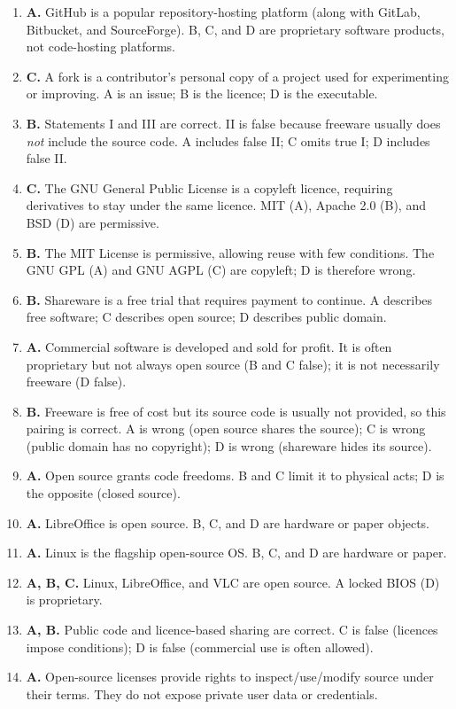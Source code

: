 \begin{enumerate}[label=\textbf{Q\arabic*.}, leftmargin=*]
  shareware.
\item \textbf{A.} GitHub is a popular repository-hosting platform (along with
  GitLab, Bitbucket, and SourceForge). B, C, and D are proprietary software
  products, not code-hosting platforms.
\item \textbf{C.} A fork is a contributor's personal copy of a project used
  for experimenting or improving. A is an issue; B is the licence; D is the
  executable.
\item \textbf{B.} Statements I and III are correct. II is false because
  freeware usually does \emph{not} include the source code. A includes false
  II; C omits true I; D includes false II.
\item \textbf{C.} The GNU General Public License is a copyleft licence,
  requiring derivatives to stay under the same licence. MIT (A), Apache 2.0
  (B), and BSD (D) are permissive.
\item \textbf{B.} The MIT License is permissive, allowing reuse with few
  conditions. The GNU GPL (A) and GNU AGPL (C) are copyleft; D is therefore
  wrong.
\item \textbf{B.} Shareware is a free trial that requires payment to continue.
  A describes free software; C describes open source; D describes public
  domain.
\item \textbf{A.} Commercial software is developed and sold for profit. It is
  often proprietary but not always open source (B and C false); it is not
  necessarily freeware (D false).
\item \textbf{B.} Freeware is free of cost but its source code is usually not
  provided, so this pairing is correct. A is wrong (open source shares the
  source); C is wrong (public domain has no copyright); D is wrong (shareware
  hides its source).

\item \textbf{A.} Open source grants code freedoms. B and C limit it to physical acts; D is the opposite (closed source).
\item \textbf{A.} LibreOffice is open source. B, C, and D are hardware or paper objects.
\item \textbf{A.} Linux is the flagship open-source OS. B, C, and D are hardware or paper.
\item \textbf{A, B, C.} Linux, LibreOffice, and VLC are open source. A locked BIOS (D) is proprietary.
\item \textbf{A, B.} Public code and licence-based sharing are correct. C is false (licences impose conditions); D is false (commercial use is often allowed).
\item \textbf{A.} Open-source licenses provide rights to inspect/use/modify source under their terms. They do not expose private user data or credentials.


\end{enumerate}
